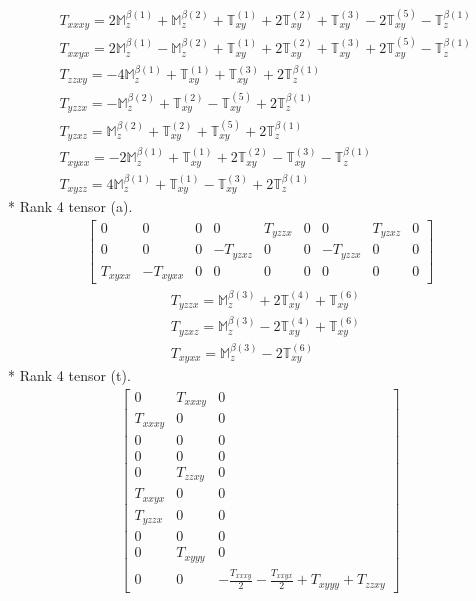 \documentclass[fleqn,8pt,landscape]{jsarticle}
\begin{document}
\begin{align*}
& T_{xxxy} = 2 \mathbb{M}_{z}^{\beta(1)} + \mathbb{M}_{z}^{\beta(2)} + \mathbb{T}_{xy}^{(1)} + 2 \mathbb{T}_{xy}^{(2)} + \mathbb{T}_{xy}^{(3)} - 2 \mathbb{T}_{xy}^{(5)} - \mathbb{T}_{z}^{\beta(1)} \\
& T_{xxyx} = 2 \mathbb{M}_{z}^{\beta(1)} - \mathbb{M}_{z}^{\beta(2)} + \mathbb{T}_{xy}^{(1)} + 2 \mathbb{T}_{xy}^{(2)} + \mathbb{T}_{xy}^{(3)} + 2 \mathbb{T}_{xy}^{(5)} - \mathbb{T}_{z}^{\beta(1)} \\
& T_{zzxy} = - 4 \mathbb{M}_{z}^{\beta(1)} + \mathbb{T}_{xy}^{(1)} + \mathbb{T}_{xy}^{(3)} + 2 \mathbb{T}_{z}^{\beta(1)} \\
& T_{yzzx} = - \mathbb{M}_{z}^{\beta(2)} + \mathbb{T}_{xy}^{(2)} - \mathbb{T}_{xy}^{(5)} + 2 \mathbb{T}_{z}^{\beta(1)} \\
& T_{yzxz} = \mathbb{M}_{z}^{\beta(2)} + \mathbb{T}_{xy}^{(2)} + \mathbb{T}_{xy}^{(5)} + 2 \mathbb{T}_{z}^{\beta(1)} \\
& T_{xyxx} = - 2 \mathbb{M}_{z}^{\beta(1)} + \mathbb{T}_{xy}^{(1)} + 2 \mathbb{T}_{xy}^{(2)} - \mathbb{T}_{xy}^{(3)} - \mathbb{T}_{z}^{\beta(1)} \\
& T_{xyzz} = 4 \mathbb{M}_{z}^{\beta(1)} + \mathbb{T}_{xy}^{(1)} - \mathbb{T}_{xy}^{(3)} + 2 \mathbb{T}_{z}^{\beta(1)}
\end{align*}
* Rank 4 tensor (a).
\begin{align*}
\begin{bmatrix} 0 & 0 & 0 & 0 & T_{yzzx} & 0 & 0 & T_{yzxz} & 0 \\ 0 & 0 & 0 & - T_{yzxz} & 0 & 0 & - T_{yzzx} & 0 & 0 \\ T_{xyxx} & - T_{xyxx} & 0 & 0 & 0 & 0 & 0 & 0 & 0 \end{bmatrix}
\end{align*}
\begin{align*}
& T_{yzzx} = \mathbb{M}_{z}^{\beta(3)} + 2 \mathbb{T}_{xy}^{(4)} + \mathbb{T}_{xy}^{(6)} \\
& T_{yzxz} = \mathbb{M}_{z}^{\beta(3)} - 2 \mathbb{T}_{xy}^{(4)} + \mathbb{T}_{xy}^{(6)} \\
& T_{xyxx} = \mathbb{M}_{z}^{\beta(3)} - 2 \mathbb{T}_{xy}^{(6)}
\end{align*}
* Rank 4 tensor (t).
\begin{align*}
\begin{bmatrix} 0 & T_{xxxy} & 0 \\ T_{xxxy} & 0 & 0 \\ 0 & 0 & 0 \\ 0 & 0 & 0 \\ 0 & T_{zzxy} & 0 \\ T_{xxyx} & 0 & 0 \\ T_{yzzx} & 0 & 0 \\ 0 & 0 & 0 \\ 0 & T_{xyyy} & 0 \\ 0 & 0 & - \frac{T_{xxxy}}{2} - \frac{T_{xxyx}}{2} + T_{xyyy} + T_{zzxy} \end{bmatrix}
\end{align*}
\end{document}

